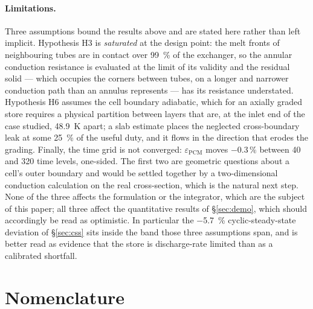 \paragraph{Limitations.}
Three assumptions bound the results above and are stated here rather than left
implicit. Hypothesis H3 is \emph{saturated} at the design point: the melt fronts
of neighbouring tubes are in contact over \SI{99}{\percent} of the exchanger, so
the annular conduction resistance is evaluated at the limit of its validity and
the residual solid --- which occupies the corners between tubes, on a longer and
narrower conduction path than an annulus represents --- has its resistance
understated. Hypothesis H6 assumes the cell boundary adiabatic, which for an
axially graded store requires a physical partition between layers that are, at
the inlet end of the case studied, \SI{48.9}{\kelvin} apart; a slab estimate
places the neglected cross-boundary leak at some \SI{25}{\percent} of the useful
duty, and it flows in the direction that erodes the grading. Finally, the time
grid is not converged: $\varepsilon_{\mathrm{PCM}}$ moves $-0.3\,\%$ between
\num{40} and \num{320} time levels, one-sided. The first two are geometric
questions about a cell's outer boundary and would be settled together by a
two-dimensional conduction calculation on the real cross-section, which is the
natural next step. None of the three affects the formulation or the integrator,
which are the subject of this paper; all three affect the quantitative results
of \S\ref{sec:demo}, which should accordingly be read as optimistic. In
particular the \SI{-5.7}{\percent} cyclic-steady-state deviation of
\S\ref{sec:css} sits inside the band those three assumptions span, and is
better read as evidence that the store is discharge-rate limited than as a
calibrated shortfall.

\section*{Nomenclature}

